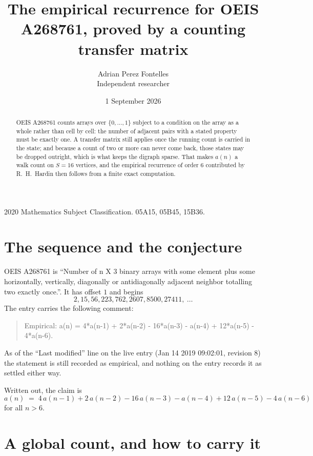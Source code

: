\documentclass[11pt,a4paper]{article}
\title{The empirical recurrence for OEIS A268761, proved by a counting transfer matrix}
\author{Adrian Perez Fontelles\\ \small Independent researcher}
\date{1 September 2026}
\theoremstyle{plain}
\theoremstyle{definition}
\begin{document}
\maketitle

\begin{abstract}
OEIS A268761 counts arrays over $\{0,\dots,1\}$ subject to a condition on the array as a
whole rather than cell by cell: the number of adjacent pairs with a stated property must be
exactly one. A transfer matrix still applies once the running count is carried in the state; and
because a count of two or more can never come back, those states may be dropped outright,
which is what keeps the digraph sparse. That makes $a(n)$ a walk count on $S=16$ vertices,
and the empirical recurrence of order $6$ contributed by R.~H.~Hardin then follows from
a finite exact computation.
\end{abstract}

\noindent\small 2020 Mathematics Subject Classification. 05A15, 05B45, 15B36.\normalsize

\section{The sequence and the conjecture}

OEIS A268761 is ``Number of n X 3 binary arrays with some element plus some horizontally, vertically, diagonally or antidiagonally adjacent neighbor totalling two exactly once.''. It has offset $1$ and begins
\[
2, 15, 56, 223, 762, 2607, 8500, 27411,\ \dots
\]
The entry carries the following comment:
\begin{quote}\small
Empirical: a(n) = 4*a(n-1) + 2*a(n-2) - 16*a(n-3) - a(n-4) + 12*a(n-5) - 4*a(n-6).
\end{quote}
As of the ``Last modified'' line on the live entry (Jan 14 2019 09:02:01, revision 8) the statement is
still recorded as empirical, and nothing on the entry records it as settled either way.

Written out, the claim is
\begin{equation}\label{eq:conj}
a(n)\;=\;4\,a(n-1) + 2\,a(n-2) - 16\,a(n-3) - a(n-4) + 12\,a(n-5) - 4\,a(n-6)
\end{equation}
for all $n>6$.

\section{A global count, and how to carry it}
\end{document}

